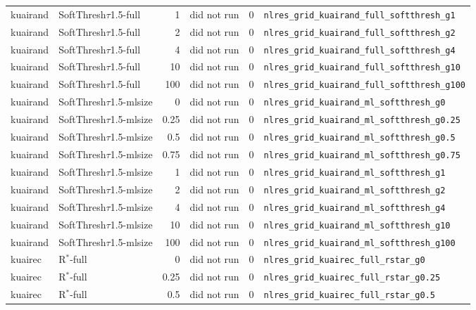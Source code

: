 \documentclass[10pt,a4paper]{article}
\begin{document}
{\begin{longtable}{llrrll}
kuairand & SoftThresh$\tau$1.5-full & 1 & did not run & 0 & \texttt{nlres\_grid\_kuairand\_full\_softthresh\_g1} \\
kuairand & SoftThresh$\tau$1.5-full & 2 & did not run & 0 & \texttt{nlres\_grid\_kuairand\_full\_softthresh\_g2} \\
kuairand & SoftThresh$\tau$1.5-full & 4 & did not run & 0 & \texttt{nlres\_grid\_kuairand\_full\_softthresh\_g4} \\
kuairand & SoftThresh$\tau$1.5-full & 10 & did not run & 0 & \texttt{nlres\_grid\_kuairand\_full\_softthresh\_g10} \\
kuairand & SoftThresh$\tau$1.5-full & 100 & did not run & 0 & \texttt{nlres\_grid\_kuairand\_full\_softthresh\_g100} \\
kuairand & SoftThresh$\tau$1.5-mlsize & 0 & did not run & 0 & \texttt{nlres\_grid\_kuairand\_ml\_softthresh\_g0} \\
kuairand & SoftThresh$\tau$1.5-mlsize & 0.25 & did not run & 0 & \texttt{nlres\_grid\_kuairand\_ml\_softthresh\_g0.25} \\
kuairand & SoftThresh$\tau$1.5-mlsize & 0.5 & did not run & 0 & \texttt{nlres\_grid\_kuairand\_ml\_softthresh\_g0.5} \\
kuairand & SoftThresh$\tau$1.5-mlsize & 0.75 & did not run & 0 & \texttt{nlres\_grid\_kuairand\_ml\_softthresh\_g0.75} \\
kuairand & SoftThresh$\tau$1.5-mlsize & 1 & did not run & 0 & \texttt{nlres\_grid\_kuairand\_ml\_softthresh\_g1} \\
kuairand & SoftThresh$\tau$1.5-mlsize & 2 & did not run & 0 & \texttt{nlres\_grid\_kuairand\_ml\_softthresh\_g2} \\
kuairand & SoftThresh$\tau$1.5-mlsize & 4 & did not run & 0 & \texttt{nlres\_grid\_kuairand\_ml\_softthresh\_g4} \\
kuairand & SoftThresh$\tau$1.5-mlsize & 10 & did not run & 0 & \texttt{nlres\_grid\_kuairand\_ml\_softthresh\_g10} \\
kuairand & SoftThresh$\tau$1.5-mlsize & 100 & did not run & 0 & \texttt{nlres\_grid\_kuairand\_ml\_softthresh\_g100} \\
kuairec & R$^*$-full & 0 & did not run & 0 & \texttt{nlres\_grid\_kuairec\_full\_rstar\_g0} \\
kuairec & R$^*$-full & 0.25 & did not run & 0 & \texttt{nlres\_grid\_kuairec\_full\_rstar\_g0.25} \\
kuairec & R$^*$-full & 0.5 & did not run & 0 & \texttt{nlres\_grid\_kuairec\_full\_rstar\_g0.5} \\

\end{longtable}}
\end{document}
